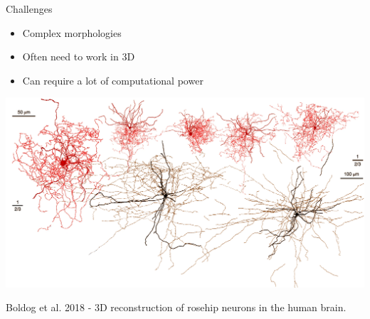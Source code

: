 \documentclass[9pt, aspectratio=169]{beamer}
\begin{document}
\begin{frame}
    {Challenges}
    \begin{itemize}
        \item Complex morphologies
        \item Often need to work in 3D
        \item Can require a lot of computational power
    \end{itemize}
    \centering
    \includegraphics[width=.6\textwidth]{Boldog2018-neurons.png}

    \footnotesize
    Boldog et al. 2018 - 3D reconstruction of rosehip neurons in the human brain.

\end{frame}
\end{document}
